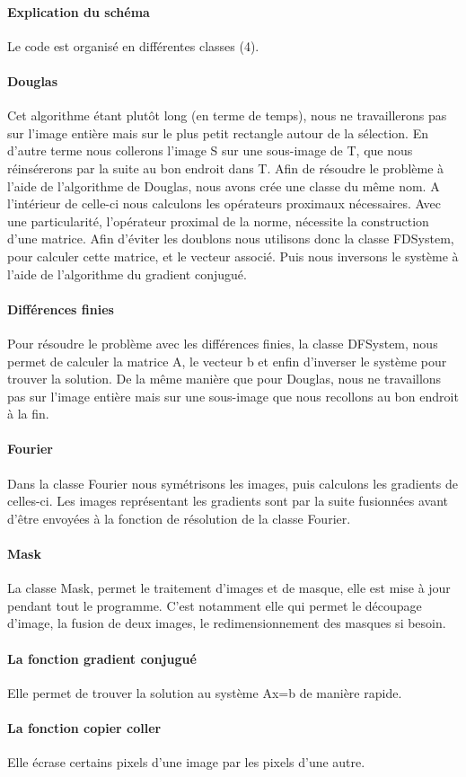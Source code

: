 \paragraph{Explication du schéma}
Le code est organisé en différentes classes (4).
\paragraph{Douglas}
Cet algorithme étant plutôt long (en terme de temps), nous ne travaillerons pas sur l'image entière mais sur le plus petit rectangle autour de la sélection. En d'autre terme nous collerons l'image S sur une sous-image de T, que nous réinsérerons par la suite au bon endroit dans T. Afin de résoudre le problème à l'aide de l'algorithme de Douglas, nous avons crée une classe du même nom.  A l'intérieur de celle-ci nous calculons les opérateurs proximaux nécessaires. Avec une particularité, l'opérateur proximal de la norme, nécessite la construction d'une matrice. Afin d'éviter les doublons nous utilisons donc la classe FDSystem, pour calculer cette matrice, et le vecteur associé. Puis nous inversons le système à l'aide de l'algorithme du gradient conjugué. 
\paragraph{Différences finies}
Pour résoudre le problème avec les différences finies, la classe DFSystem, nous permet de calculer la matrice A, le vecteur b et enfin d'inverser le système pour trouver la solution. De la même manière que pour Douglas, nous ne travaillons pas sur l'image entière mais sur une sous-image que nous recollons au bon endroit à la fin.
\paragraph{Fourier}
Dans la classe Fourier nous symétrisons les images, puis calculons les gradients de celles-ci. Les images représentant les gradients sont par la suite fusionnées avant d'être envoyées à la fonction de résolution de la classe Fourier. 
\paragraph{Mask}
La classe Mask, permet le traitement d'images et de masque, elle est mise à jour pendant tout le programme. C'est notamment elle qui permet le découpage d'image, la fusion de deux images, le redimensionnement des masques si besoin. 
\paragraph{La fonction gradient conjugué}
Elle permet de trouver la solution au système Ax=b de manière rapide.
\paragraph{La fonction copier coller} 
Elle écrase certains pixels d'une image par les pixels d'une autre.